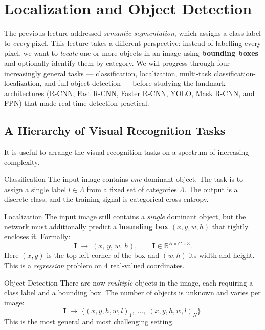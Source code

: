 \documentclass[11pt,a4paper]{article}
\newcommand{\term}[1]{\textcolor{DefGreen}{\textbf{#1}}}
\begin{document}
\section{Localization and Object Detection}
\label{sec:localization_detection}

The previous lecture addressed \emph{semantic segmentation}, which assigns a class label to \emph{every} pixel. This lecture takes a different perspective: instead of labelling every pixel, we want to \emph{locate} one or more objects in an image using \term{bounding boxes} and optionally identify them by category. We will progress through four increasingly general tasks — classification, localization, multi-task classification-localization, and full object detection — before studying the landmark architectures (R-CNN, Fast R-CNN, Faster R-CNN, YOLO, Mask R-CNN, and FPN) that made real-time detection practical.

\subsection{A Hierarchy of Visual Recognition Tasks}
\label{sec:task_hierarchy}

It is useful to arrange the visual recognition tasks on a spectrum of increasing complexity.

\begin{defbox}{Classification}
The input image contains \emph{one} dominant object. The task is to assign a single label $l \in \Lambda$ from a fixed set of categories $\Lambda$. The output is a discrete class, and the training signal is categorical cross-entropy.
\end{defbox}

\begin{defbox}{Localization}
The input image still contains a \emph{single} dominant object, but the network must additionally predict a \term{bounding box} $(x, y, w, h)$ that tightly encloses it. Formally:
\[
  \mathbf{I} \;\longrightarrow\; (x,\,y,\,w,\,h), \qquad \mathbf{I} \in \mathbb{R}^{R \times C \times 3}.
\]
Here $(x, y)$ is the top-left corner of the box and $(w, h)$ its width and height. This is a \emph{regression} problem on 4 real-valued coordinates.
\end{defbox}

\begin{defbox}{Object Detection}
There are now \emph{multiple} objects in the image, each requiring a class label and a bounding box. The number of objects is unknown and varies per image:
\[
  \mathbf{I} \;\longrightarrow\; \bigl\{(x, y, h, w, l)_1,\; \ldots,\; (x, y, h, w, l)_N\bigr\}.
\]
This is the most general and most challenging setting.
\end{defbox}
\end{document}

